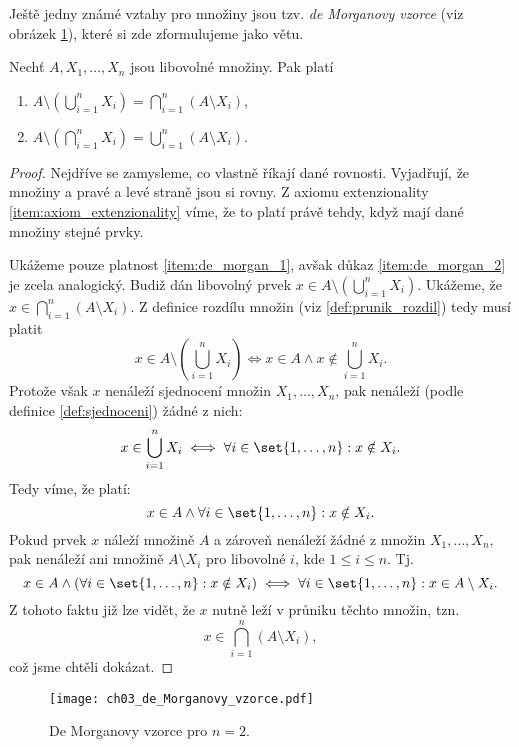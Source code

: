 Ještě jedny známé vztahy pro množiny jsou tzv. \emph{de Morganovy vzorce} (viz obrázek \ref{fig:de_morgan}), které si zde zformulujeme jako větu.
\begin{theorem}
    Nechť $A,X_1,\dots,X_n$ jsou libovolné množiny. Pak platí
    \begin{enumerate}[label=(\roman*)]
        \item\label{item:de_morgan_1} $\displaystyle A \setminus \left(\bigcup\limits_{i=1}^{n}{X_i}\right)=\bigcap\limits_{i=1}^{n}{(A \setminus X_i)}$,
        \item\label{item:de_morgan_2} $\displaystyle A \setminus \left(\bigcap\limits_{i=1}^{n}{X_i}\right)=\bigcup\limits_{i=1}^{n}{(A \setminus X_i)}$.
    \end{enumerate}
\end{theorem}
\begin{proof}
    Nejdříve se zamysleme, co vlastně říkají dané rovnosti. Vyjadřují, že množiny a pravé a levé straně jsou si rovny. Z axiomu extenzionality \ref{item:axiom_extenzionality} víme, že to platí právě tehdy, když mají dané množiny stejné prvky.\par
    Ukážeme pouze platnost \ref{item:de_morgan_1}, avšak důkaz \ref{item:de_morgan_2} je zcela analogický. Budiž dán libovolný prvek $x\in A \setminus \left(\bigcup_{i=1}^{n}{X_i}\right)$. Ukážeme, že $x\in\bigcap_{i=1}^{n}{(A \setminus X_i)}$. Z definice rozdílu množin (viz \ref{def:prunik_rozdil}) tedy musí platit
    \begin{equation*}
        x\in A \setminus \left(\bigcup\limits_{i=1}^{n}{X_i}\right)\iff x\in A \land x\notin \bigcup\limits_{i=1}^{n}{X_i}.
    \end{equation*}
    Protože však $x$ nenáleží sjednocení množin $X_1,\dots,X_n$, pak nenáleží (podle definice \ref{def:sjednoceni}) žádné z nich:
    \begin{equation*}
        x\in\bigcup\limits_{i=1}^{n}{X_i}\iff\forall i\in\set{1,\dots,n}: x\notin X_i.
    \end{equation*}
    Tedy víme, že platí:
    \begin{equation*}
        x\in A \land \forall i\in\set{1,\dots,n}: x\notin X_i.
    \end{equation*}
    Pokud prvek $x$ náleží množině $A$ a zároveň nenáleží žádné z množin $X_1,\dots,X_n$, pak nenáleží ani množině $A\setminus X_i$ pro libovolné $i$, kde $1\leq i\leq n$. Tj.
    \begin{equation*}
        x\in A \land (\forall i\in\set{1,\dots,n}: x\notin X_i)\iff \forall i\in\set{1,\dots,n}: x\in A\setminus X_i.
    \end{equation*}
    Z tohoto faktu již lze vidět, že $x$ nutně leží v průniku těchto množin, tzn.
    \begin{equation*}
        x\in\bigcap\limits_{i=1}^{n}{(A \setminus X_i)},
    \end{equation*} 
    což jsme chtěli dokázat.
\end{proof}
\begin{figure}[h]
	\centering
	\texttt{[image: ch03\_de\_Morganovy\_vzorce.pdf]}
    \caption{De Morganovy vzorce pro $n=2$.}
    \label{fig:de_morgan}
\end{figure}